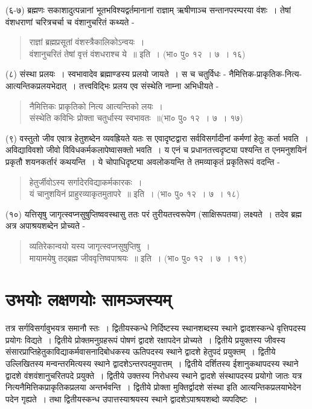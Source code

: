 {(६-७) ब्रह्मणः सकाशादुत्पन्नानां भूतभविश्यद्वर्तमानानां राज्ञाम् ऋषीणाञ्च सन्तानपरम्परया वंशः~। तेषां वंशधराणां चरित्रचर्चा च वंशानुचरितं कथ्यते -
\begin{verse}
राज्ञां ब्रह्मप्रसूतां वंशस्त्रैकालिकोऽन्वयः~। \\
वंशानुचरितं तेषां वृत्तं वंशधराश्च ये~॥ इति~। (भा० पु० १२~। ७~। १६)
\end{verse}
(८) संस्था प्रलयः~। स्वभावादेव ब्रह्माण्डस्य प्रलयो जायते~। स च चतुर्विधः - नैमित्तिक-प्राकृतिक-नित्य-आत्यन्तिकप्रलयभेदात्~। तत्त्वविद्भिः प्रलय एव संस्थेति नाम्ना अभिधीयते -
\begin{verse}
नैमित्तिकः प्राकृतिको नित्य आत्यन्तिको लयः~। \\
संस्थेति कविभिः प्रोक्ता चतुर्धास्य स्वभावतः~॥(भा० पु० १२~। ७~। १७)
\end{verse}
(९) वस्तुतो जीव एवात्र हेतुशब्देन व्यवह्रियते यतः स एवादृष्टद्वारा सर्वविसर्गादीनां कर्मणां हेतुः कर्ता भवति~। अविद्याविवशो जीवो विविधकर्मकलापेष्वासक्तो भवति~। य एनं च प्रधानतत्त्वदृष्ट्या पश्यन्ति त एनमनुशयिनं प्रकृतौ शयनकर्तारं कथयन्ति~। ये चोपाधिदृष्ट्या अवलोकयन्ति ते तमव्याकृतं प्रकृतिरूपं वदन्ति -
\begin{verse}
हेतुर्जीवोऽस्य सर्गादेरविद्याकर्मकारकः~। \\
यं चानुशयिनं प्राहुरव्याकृतमुतापरे~॥ इति~। (भा० पु० १२~। ७~। १८)
\end{verse}
(१०) यत्तिसृषु जागृत्स्वप्नसुषुप्तिष्ववस्थासु ततः परं तुरीयतत्त्वरूपेण (साक्षिरूपतया) लक्ष्यते~। तदेव ब्रह्म अत्र अपाश्रयशब्देन प्रोच्यते -
\begin{verse}
व्यतिरेकान्वयो यस्य जागृत्स्वप्नसुषुप्तिषु~। \\
मायामयेषु तद्ब्रह्म जीववृत्तिष्वपाश्रयः~॥ इति~। (भा० पु० १२~। ७~। १९)
\end{verse}

\section*{उभयोः लक्षणयोः सामञ्जस्यम्}

तत्र सर्गविसर्गावुभयत्र समानौ स्तः~। द्वितीयस्कन्धे निर्दिष्टस्य स्थानशब्दस्य स्थाने द्वादशस्कन्धे वृत्तिपदस्य प्रयोगः विद्यते~। द्वितीये प्रोक्तमनुग्रहरूपं पोषणं द्वादशे रक्षापदेन प्रोच्यते~। द्वितीये प्रयुक्तस्य जीवस्य संसारप्राप्तिहेतुकाविद्याकर्मवासनादिबोधकस्य ऊतिपदस्य स्थाने द्वादशे हेतुपदं प्रयुक्तम्~। द्वितीये उल्लिखितस्य मन्वन्तरमित्यस्य स्थाने द्वादशेऽन्तरपदमुपात्तम्~। द्वितीये दर्शितस्य ईशानुकथापदस्य स्थाने द्वादशे वंशवंशानुचरितपदे प्रयुक्ते~। द्वितीये उक्तस्य निरोधस्य स्थाने द्वादशे संस्थापदस्य प्रयोगो जातः यत्र नित्यनैमित्तिकप्राकृतिकप्रलया अन्तर्भवन्ति~। द्वितीये प्रोक्ता मुक्तिर्द्वादशे संस्था इति आत्यन्तिकप्रलयाभेदेन पदेन गृह्यते~। तथा द्वितीयस्कन्ध उपात्तस्याश्रयस्य स्थाने द्वादशेऽपाश्रयशब्दो व्यपदिष्टः~। 

}
